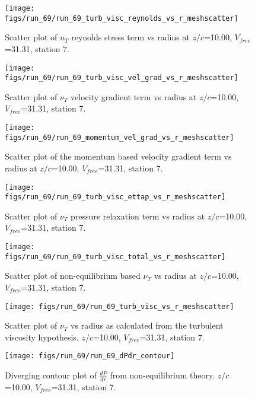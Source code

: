 \begin{figure}[H]
\centering
\texttt{[image: figs/run\_69/run\_69\_turb\_visc\_reynolds\_vs\_r\_meshscatter]}
\caption{Scatter plot of $
u_T$ reynolds stress term vs radius at $z/c$=10.00, $V_{free}$=31.31, station 7.}
\end{figure}


\begin{figure}[H]
\centering
\texttt{[image: figs/run\_69/run\_69\_turb\_visc\_vel\_grad\_vs\_r\_meshscatter]}
\caption{Scatter plot of $\nu_T$ velocity gradient term vs radius at $z/c$=10.00, $V_{free}$=31.31, station 7.}
\end{figure}


\begin{figure}[H]
\centering
\texttt{[image: figs/run\_69/run\_69\_momentum\_vel\_grad\_vs\_r\_meshscatter]}
\caption{Scatter plot of the momentum based velocity gradient term vs radius at $z/c$=10.00, $V_{free}$=31.31, station 7.}
\end{figure}


\begin{figure}[H]
\centering
\texttt{[image: figs/run\_69/run\_69\_turb\_visc\_ettap\_vs\_r\_meshscatter]}
\caption{Scatter plot of $\nu_T$ pressure relaxation term vs radius at $z/c$=10.00, $V_{free}$=31.31, station 7.}
\end{figure}


\begin{figure}[H]
\centering
\texttt{[image: figs/run\_69/run\_69\_turb\_visc\_total\_vs\_r\_meshscatter]}
\caption{Scatter plot of non-equilibrium based $\nu_T$ vs radius at $z/c$=10.00, $V_{free}$=31.31, station 7.}
\end{figure}


\begin{figure}[H]
\centering
\texttt{[image: figs/run\_69/run\_69\_turb\_visc\_vs\_r\_meshscatter]}
\caption{Scatter plot of $\nu_T$ vs radius as calculated from the turbulent viscosity hypothesis. $z/c$=10.00, $V_{free}$=31.31, station 7.}
\end{figure}


\begin{figure}[H]
\centering
\texttt{[image: figs/run\_69/run\_69\_dPdr\_contour]}
\caption{Diverging contour plot of $\frac{d\bar{P}}{dr}$ from non-equilibrium theory. $z/c$=10.00, $V_{free}$=31.31, station 7.}
\end{figure}


